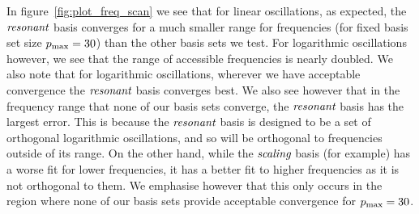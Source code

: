     In figure~\ref{fig:plot_freq_scan} we see that for linear oscillations, as expected,
    the $\textit{resonant}$ basis converges for a much smaller range for frequencies
    (for fixed basis set size $p_\text{max}=30$) than the other basis sets we test.
    For logarithmic oscillations however, we see that the range of accessible
    frequencies is nearly doubled. We also note that for logarithmic oscillations,
    wherever we have acceptable convergence the $\textit{resonant}$ basis converges best.
    We also see however that in the frequency range that none of our basis sets
    converge, the $\textit{resonant}$ basis has the largest error. This is because
    the $\textit{resonant}$ basis is designed to be a set of orthogonal logarithmic
    oscillations, and so will be orthogonal to frequencies outside of its range.
    On the other hand, while the $\textit{scaling}$ basis (for example) has
    a worse fit for lower frequencies, it has a better fit to higher frequencies as
    it is not orthogonal to them. We emphasise however that this only occurs
    in the region where none of our basis sets provide acceptable convergence
    for $p_\text{max}=30$.

